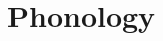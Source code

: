 \documentclass[Banzonaa.tex]{subfiles}
\begin{document}
\section{Phonology}
\blindtext
\end{document}

